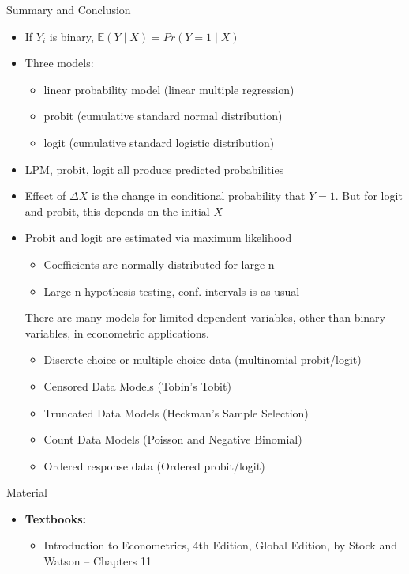 \documentclass[notes,10pt, aspectratio=169]{beamer}
\begin{document}
\begin{frame}{Summary and Conclusion}
  \begin{itemize}
    \item If $Y_i$ is binary, $\mathbb{E}(Y\mid X)=Pr(Y=1\mid X)$
    \item Three models: 
    \begin{itemize}
        \item linear probability model (linear multiple regression)
        \item probit (cumulative standard normal distribution)
        \item logit (cumulative standard logistic distribution)
    \end{itemize}
    \item LPM, probit, logit all produce predicted probabilities
    \item Effect of $\Delta X$ is the change in conditional probability that $Y=1$. But for logit and probit, this depends on the initial $X$
    \item Probit and logit are estimated via maximum likelihood
  \begin{itemize}
    \item Coefficients are normally distributed for large n
    \item Large-n hypothesis testing, conf. intervals is as usual
  \end{itemize}
  There are many models for limited dependent variables, other than binary variables,  in econometric applications.
  \begin{itemize}
    \item Discrete choice or multiple choice data (multinomial probit/logit)
    \item Censored Data Models (Tobin's Tobit)
    \item Truncated Data Models (Heckman's Sample Selection)
    \item Count Data Models (Poisson and Negative Binomial)
    \item Ordered response data (Ordered probit/logit)
  \end{itemize}

  \end{itemize}
\end{frame}



\begin{frame}[allowframebreaks]{Material}
\begin{itemize}
    \item[--] \textbf{Textbooks:}
    \begin{itemize}
        \item Introduction to Econometrics, 4th Edition, Global Edition, by Stock and Watson -- Chapters 11
    \end{itemize}
\end{itemize}
\end{frame}
\end{document}
